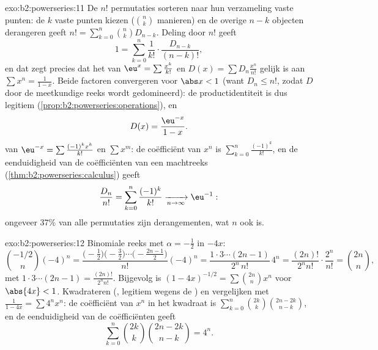 \begin{solution}{exo:b2:powerseries:11}
De $n!$ permutaties sorteren naar hun verzameling vaste punten: de
$k$ vaste punten kiezen ($\binom nk$ manieren) en de overige $n -
k$ objecten derangeren geeft $n! = \sum_{k=0}^n\binom nk D_{n-k}$.
Deling door $n!$ geeft
\[
1 = \sum_{k=0}^{n}\frac{1}{k!}\cdot\frac{D_{n-k}}{(n-k)!} ,
\]
en dat zegt precies dat het  van $\eu^x =
\sum\frac{x^k}{k!}$ en $D(x) = \sum D_n\frac{x^n}{n!}$ gelijk is
aan $\sum x^n = \frac{1}{1-x}$. Beide factoren convergeren 
voor $\abs x < 1$ (want $D_n \leq n!$, zodat $D$ door de
meetkundige reeks wordt gedomineerd): de productidentiteit is dus
legitiem (\cref{prop:b2:powerseries:operations}), en
\[
D(x) = \frac{\eu^{-x}}{1-x} .
\]
 van $\eu^{-x} = \sum\frac{(-1)^kx^k}{k!}$ en $\sum
x^m$: de coëfficiënt van $x^n$ is $\sum_{k=0}^{n}\frac{(-1)^k}{k!}$,
en de eenduidigheid van de coëfficiënten van een machtreeks
(\cref{thm:b2:powerseries:calculus}) geeft
\[
\frac{D_n}{n!} = \sum_{k=0}^{n}\frac{(-1)^k}{k!}
\xrightarrow[n\to\infty]{} \eu^{-1} :
\]
ongeveer $37\%$ van alle permutaties zijn derangementen, wat $n$
ook is.
\end{solution}

\begin{solution}{exo:b2:powerseries:12}
Binomiale reeks met $\alpha = -\frac12$ in $-4x$:
\[
\binom{-1/2}{n}(-4)^n
= \frac{\bigl(-\frac12\bigr)\bigl(-\frac32\bigr)\cdots
\bigl(-\frac{2n-1}2\bigr)}{n!}(-4)^n
= \frac{1\cdot3\cdots(2n-1)}{2^n\,n!}\,4^n
= \frac{(2n)!}{2^n n!}\cdot\frac{2^n}{n!}
= \binom{2n}{n},
\]
met $1\cdot3\cdots(2n-1) = \frac{(2n)!}{2^nn!}$. Bijgevolg is
$(1-4x)^{-1/2} = \sum\binom{2n}nx^n$ voor $\abs{4x} < 1$.
Kwadrateren (, legitiem wegens de ) en vergelijken met $\frac{1}{1-4x} = \sum 4^nx^n$: de
coëfficiënt van $x^n$ in het kwadraat is
$\sum_{k=0}^n\binom{2k}k\binom{2n-2k}{n-k}$, en de eenduidigheid
van de coëfficiënten geeft
\[
\sum_{k=0}^{n}\binom{2k}{k}\binom{2n-2k}{n-k} = 4^n .
\]
\end{solution}

